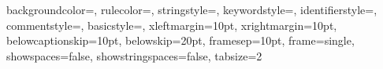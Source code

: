  {
	backgroundcolor=\color{codebg},
	rulecolor=\color{codeborder},
	stringstyle=\color{purple},
	keywordstyle=\color{darkblue},
	identifierstyle=\color{lightblue},
	commentstyle=\color{lightgreen},
	basicstyle=\footnotesize\sffamily,
	xleftmargin=10pt,
	xrightmargin=10pt,
	belowcaptionskip=10pt,
	belowskip=20pt,
	framesep=10pt,
	frame=single,
	showspaces=false,
	showstringspaces=false,
	tabsize=2
}

\lstset {
	style=default_style
}